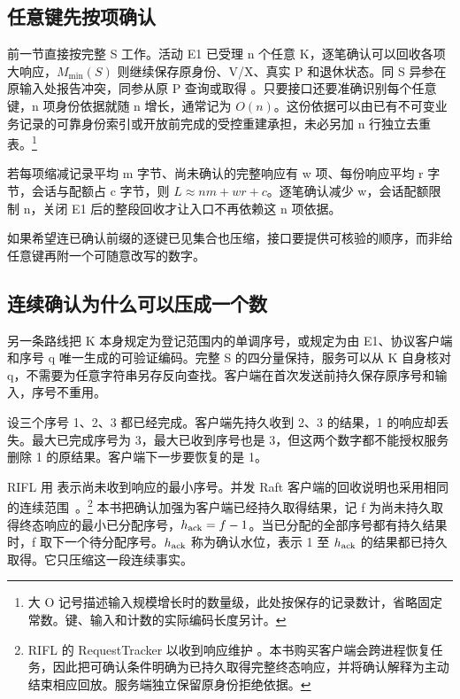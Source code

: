 \subsection*{任意键先按项确认}

前一节直接按完整 S 工作。活动 E1 已受理 n 个任意 K，逐笔确认可以回收各项大响应，$M_{\min}(S)$ 则继续保存原身份、V/X、真实 P 和退休状态。同 S 异参在原输入处报告冲突，同参从原 P 查询或取得 。只要接口还要准确识别每个任意键，n 项身份依据就随 n 增长，通常记为 $O(n)$。这份依据可以由已有不可变业务记录的可靠身份索引或开放前完成的受控重建承担，未必另加 n 行独立去重表。\footnote{大 O 记号描述输入规模增长时的数量级，此处按保存的记录数计，省略固定常数。键、输入和计数的实际编码长度另计。}

若每项缩减记录平均 m 字节、尚未确认的完整响应有 w 项、每份响应平均 r 字节，会话与配额占 c 字节，则 $L\approx n m+w r+c$。逐笔确认减少 w，会话配额限制 n，关闭 E1 后的整段回收才让入口不再依赖这 n 项依据。


如果希望连已确认前缀的逐键已见集合也压缩，接口要提供可核验的顺序，而非给任意键再附一个可随意改写的数字。

\subsection*{连续确认为什么可以压成一个数}

另一条路线把 K 本身规定为登记范围内的单调序号，或规定为由 E1、协议客户端和序号 q 唯一生成的可验证编码。完整 S 的四分量保持，服务可以从 K 自身核对 q，不需要为任意字符串另存反向查找。客户端在首次发送前持久保存原序号和输入，序号不重用。

设三个序号 1、2、3 都已经完成。客户端先持久收到 2、3 的结果，1 的响应却丢失。最大已完成序号为 3，最大已收到序号也是 3，但这两个数字都不能授权服务删除 1 的原结果。客户端下一步要恢复的是 1。

RIFL 用  表示尚未收到响应的最小序号。并发 Raft 客户端的回收说明也采用相同的连续范围~\cite{rifl,ongaro}。\footnote{RIFL 的 RequestTracker 以收到响应维护 。本书购买客户端会跨进程恢复任务，因此把可确认条件明确为已持久取得完整终态响应，并将确认解释为主动结束相应回放。服务端独立保留原身份拒绝依据。}
本书把确认加强为客户端已经持久取得结果，记 f 为尚未持久取得终态响应的最小已分配序号，$h_{\rm ack}=f-1$。当已分配的全部序号都有持久结果时，f 取下一个待分配序号。$h_{\rm ack}$ 称为确认水位，表示 1 至 $h_{\rm ack}$ 的结果都已持久取得。它只压缩这一段连续事实。


